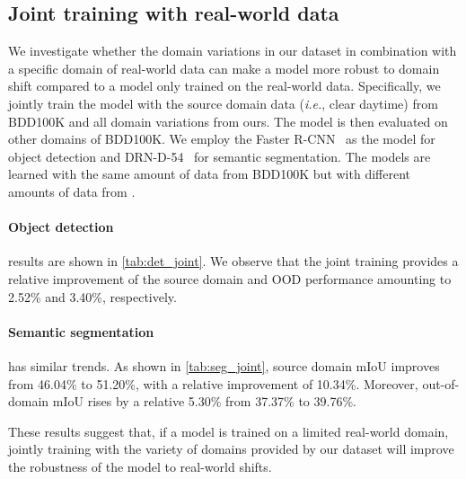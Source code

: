  

\subsection{Joint training with real-world data} \label{sec:suppl_exp_joint_training}

We investigate whether the domain variations in our dataset in combination with a specific domain of real-world data can make a model more robust to domain shift compared to a model only trained on the real-world data. 
Specifically, we jointly train the model with the source domain data (\textit{i.e.}, clear daytime) from BDD100K and all domain variations from ours. The model is then evaluated on other domains of BDD100K.
We employ the Faster R-CNN~ as the model for object detection and DRN-D-54~ for semantic segmentation. The models are learned with the same amount of data from BDD100K but with different amounts of data from \thedataset{}. 

\paragraph{Object detection} results are shown in \autoref{tab:det_joint}. We observe that the joint training provides a relative improvement of the source domain and OOD performance amounting to 2.52\% and 3.40\%, respectively.

\paragraph{Semantic segmentation} has  similar trends. As shown in \autoref{tab:seg_joint}, source domain mIoU improves from 46.04\% to 51.20\%, with a relative improvement of 10.34\%. Moreover, out-of-domain mIoU rises by a relative 5.30\% from 37.37\% to 39.76\%. 

These results suggest that, if a model is trained on a limited real-world domain, jointly training with the variety of domains provided by our dataset will improve the robustness of the model to real-world shifts.

